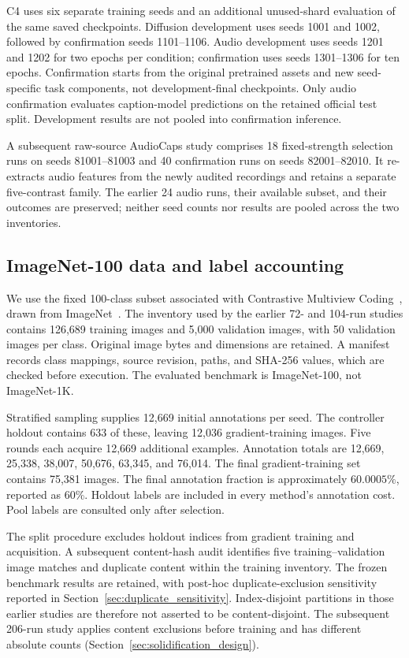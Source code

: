\documentclass[10pt,a4paper,twocolumn]{article}
\begin{document}
C4 uses six separate training seeds and an additional unused-shard
evaluation of the same saved checkpoints.
Diffusion development uses seeds 1001 and 1002, followed by
confirmation seeds 1101--1106. Audio development uses seeds
1201 and 1202 for two epochs per condition; confirmation uses
seeds 1301--1306 for ten epochs. Confirmation starts from the
original pretrained assets and new seed-specific task components,
not development-final checkpoints. Only audio confirmation
evaluates caption-model predictions on the retained official test
split. Development results are not pooled into confirmation inference.

A subsequent raw-source AudioCaps study comprises 18 fixed-strength
selection runs on seeds 81001--81003 and 40 confirmation runs on seeds
82001--82010. It re-extracts audio features from the newly audited
recordings and retains a separate five-contrast family. The earlier
24 audio runs, their available subset, and their outcomes are preserved;
neither seed counts nor results are pooled across the two inventories.

\subsection{ImageNet-100 data and label accounting}\label{sec:data_accounting}

We use the fixed 100-class subset associated with Contrastive
Multiview Coding~\cite{tian2020cmc}, drawn from
ImageNet~\cite{deng2009imagenet}.
The inventory used by the earlier 72- and 104-run studies contains
126,689 training images and 5,000 validation images,
with 50 validation images per class. Original image bytes and
dimensions are retained. A manifest records class mappings, source
revision, paths, and SHA-256 values, which are checked before
execution. The evaluated benchmark is ImageNet-100, not ImageNet-1K.

Stratified sampling supplies 12,669 initial annotations per seed.
The controller holdout contains 633 of these, leaving 12,036
gradient-training images. Five rounds each acquire 12,669
additional examples. Annotation totals are 12,669, 25,338, 38,007,
50,676, 63,345, and 76,014. The final gradient-training set
contains 75,381 images. The final annotation fraction is
approximately $60.0005\%$, reported as 60\%.
Holdout labels are included in every method's annotation cost.
Pool labels are consulted only after selection.

The split procedure excludes holdout indices from gradient training and
acquisition. A subsequent content-hash audit identifies five
training--validation image matches and duplicate content within the
training inventory. The frozen benchmark results are retained, with
post-hoc duplicate-exclusion sensitivity reported in
Section~\ref{sec:duplicate_sensitivity}. Index-disjoint partitions in those
earlier studies are therefore not asserted to be content-disjoint.
The subsequent 206-run study applies content exclusions before training
and has different absolute counts (Section~\ref{sec:solidification_design}).
\end{document}
